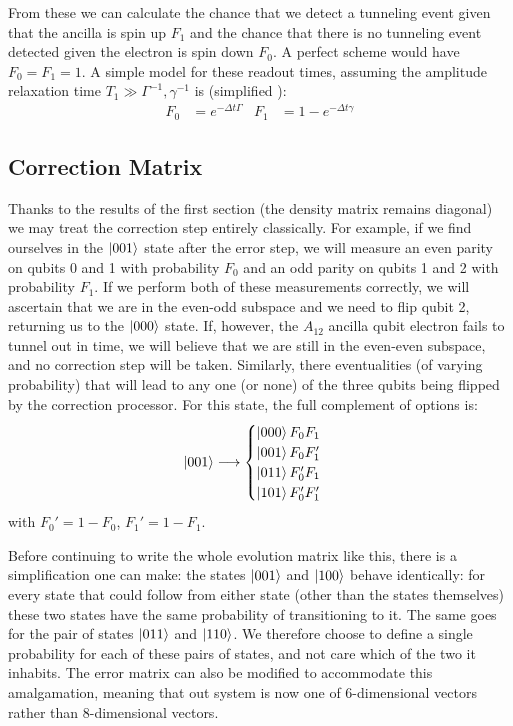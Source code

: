 \documentclass{report}
\begin{document}
From these we can calculate the chance that we detect a tunneling event given that the ancilla is spin up $F_1$ and the chance that there is no tunneling event detected given the electron is spin down $F_0$. A perfect scheme would have $F_0 = F_1 = 1$. A simple model for these readout times, assuming the amplitude relaxation time $T_1 \gg \Gamma^{-1}, \gamma^{-1}$ is (simplified \cite{Keith2019}):
\begin{align*}
    F_0 &= e^{-\Delta t \Gamma} & F_1 &= 1-e^{-\Delta t \gamma}
\end{align*}
\subsection{Correction Matrix}
Thanks to the results of the first section (the density matrix remains diagonal) we may treat the correction step entirely classically. For example, if we find ourselves in the $\ket{001}$ state after the error step, we will measure an even parity on qubits 0 and 1 with probability $F_0$ and an odd parity on qubits 1 and 2 with probability $F_1$. If we perform both of these measurements correctly, we will ascertain that we are in the even-odd subspace and we need to flip qubit 2, returning us to the $\ket{000}$ state. If, however, the $A_{12}$ ancilla qubit electron fails to tunnel out in time, we will believe that we are still in the even-even subspace, and no correction step will be taken. Similarly, there eventualities (of varying probability) that will lead to any one (or none) of the three qubits being flipped by the correction processor. For this state, the full complement of options is:
\begin{equation*}
\ket{001} \longrightarrow 
\begin{cases} 
      \ket{000} F_0 F_1 \\
      \ket{001} F_0 F_1' \\
      \ket{011} F_0' F_1 \\
      \ket{101} F_0' F_1'
   \end{cases}
\end{equation*}
with $F_0' = 1-F_0$, $F_1' = 1-F_1$.

Before continuing to write the whole evolution matrix like this, there is a simplification one can make: the states $\ket{001}$ and $\ket{100}$ behave identically: for every state that could follow from either state (other than the states themselves) these two states have the same probability of transitioning to it. The same goes for the pair of states $\ket{011}$ and $\ket{110}$. We therefore choose to define a single probability for each of these pairs of states, and not care which of the two it inhabits. The error matrix can also be modified to accommodate this amalgamation, meaning that out system is now one of 6-dimensional vectors rather than 8-dimensional vectors.
\end{document}
